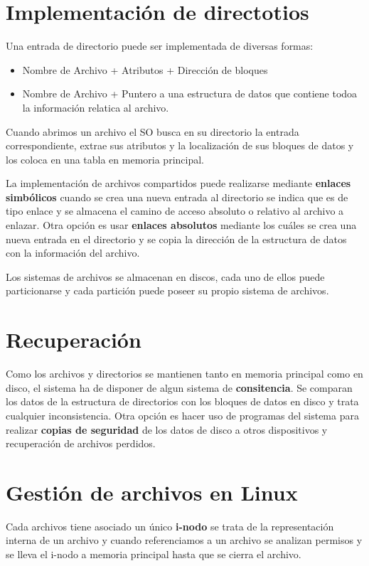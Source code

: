 \section*{Implementación de directotios}
Una entrada de directorio puede ser implementada de diversas formas:

\begin{itemize}
	\item Nombre de Archivo + Atributos + Dirección de bloques
	\item Nombre de Archivo + Puntero a una estructura de datos que contiene todoa la información relatica al archivo.
\end{itemize}

Cuando abrimos un archivo el SO busca en su directorio la entrada correspondiente, extrae sus atributos y la localización de sus bloques de datos y los coloca en una tabla en memoria principal.

La implementación de archivos compartidos puede realizarse mediante \textbf{enlaces simbólicos} cuando se crea una nueva entrada al directorio se indica que es de tipo enlace y se almacena el camino de acceso absoluto o relativo al archivo a enlazar. Otra opción es usar \textbf{enlaces absolutos} mediante los cuáles se crea una nueva entrada en el directorio y se copia la dirección de la estructura de datos con la información del archivo.

Los sistemas de archivos se almacenan en discos, cada uno de ellos puede particionarse y cada partición puede poseer su propio sistema de archivos.

\section*{Recuperación}
Como los archivos y directorios se mantienen tanto en memoria principal como en disco, el sistema ha de disponer de algun sistema de \textbf{consitencia}. Se comparan los datos de la estructura de directorios con los bloques de datos en disco y trata cualquier inconsistencia. Otra opción es hacer uso de programas del sistema para realizar \textbf{copias de seguridad} de los datos de disco a otros dispositivos y recuperación de archivos perdidos.

\section*{Gestión de archivos en Linux}
Cada archivos tiene asociado un único \textbf{i-nodo} se trata de la representación interna de un archivo y cuando referenciamos a un archivo se analizan permisos y se lleva el i-nodo a memoria principal hasta que se cierra el archivo.


